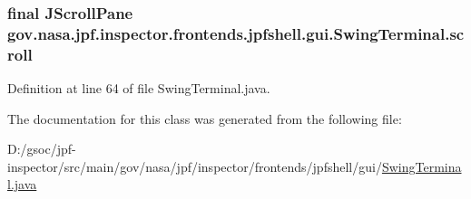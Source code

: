 \subsubsection[{\texorpdfstring{scroll}{scroll}}]{\setlength{\rightskip}{0pt plus 5cm}final J\+Scroll\+Pane gov.\+nasa.\+jpf.\+inspector.\+frontends.\+jpfshell.\+gui.\+Swing\+Terminal.\+scroll\hspace{0.3cm}{\ttfamily [private]}}\hypertarget{classgov_1_1nasa_1_1jpf_1_1inspector_1_1frontends_1_1jpfshell_1_1gui_1_1_swing_terminal_aeb4edd324a20affd3590b53878268423}{}\label{classgov_1_1nasa_1_1jpf_1_1inspector_1_1frontends_1_1jpfshell_1_1gui_1_1_swing_terminal_aeb4edd324a20affd3590b53878268423}


Definition at line 64 of file Swing\+Terminal.\+java.



The documentation for this class was generated from the following file\+:\begin{DoxyCompactItemize}
\item 
D\+:/gsoc/jpf-\/inspector/src/main/gov/nasa/jpf/inspector/frontends/jpfshell/gui/\hyperlink{_swing_terminal_8java}{Swing\+Terminal.\+java}\end{DoxyCompactItemize}
